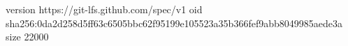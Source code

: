 version https://git-lfs.github.com/spec/v1
oid sha256:0da2d258d5ff63c6505bbc62f95199e105523a35b366fef9abb8049985aede3a
size 22000
